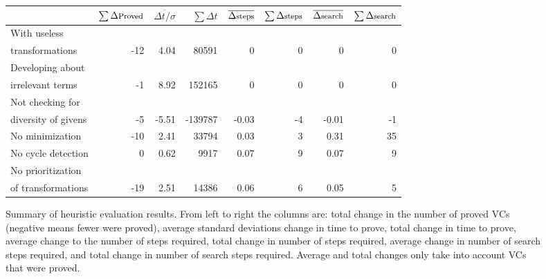 \setlength{\tabcolsep}{7pt}
\begin{figure}
	\centering
	\begin{tabular}{lrrrrrrr}
		\toprule
			& $\sum \Delta\text{\footnotesize Proved}$	& $\overline{\Delta t / \sigma}$	& $\sum\Delta t$ & $\overline{\Delta\text{\footnotesize steps}}$ & $\sum\Delta\text{\footnotesize steps}$ & $\overline{\Delta\text{\footnotesize search}}$ & $\sum\Delta\text{\footnotesize search}$ \\
		\midrule
		\footnotesize With useless \\
		\footnotesize transformations		& -12	& 4.04	& 80591		& 0	& 0	& 0	& 0	\\
		\midrule
		\footnotesize Developing about \\
		\footnotesize irrelevant terms		& -1	& 8.92	& 152165	& 0	& 0	& 0	& 0\\
		\midrule
		\footnotesize Not checking for \\
		\footnotesize diversity of givens	& -5	& -5.51	& -139787	& -0.03	& -4	& -0.01	& -1	\\
		\midrule
		\footnotesize No minimization		& -10	& 2.41	& 33794		& 0.03	& 3	& 0.31	& 35	\\
		\midrule
		\footnotesize No cycle detection	& 0	& 0.62	& 9917		& 0.07	& 9	& 0.07	& 9	\\
		\midrule
		\footnotesize No prioritization \\
		\footnotesize of transformations	& -19	& 2.51	& 14386		& 0.06	& 6	& 0.05	& 5	\\
		\bottomrule
	\end{tabular}
	\caption{Summary of heuristic evaluation results.  From left to right the columns are: total change in the number of proved VCs (negative means fewer were proved), average standard deviations change in time to prove, total change in time to prove, average change to the number of steps required, total change in number of steps required, average change in number of search steps required, and total change in number of search steps required.  Average and total changes only take into account VCs that were proved.\label{heuristicEvalTable}}
\end{figure}
\setlength{\tabcolsep}{6pt}


